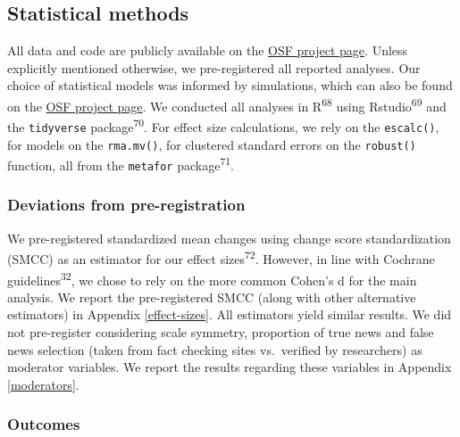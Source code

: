 \documentclass[
  doc,floatsintext]{apa6}
\begin{document}
\subsection{Statistical methods}\label{statistical-methods}

All data and code are publicly available on the \href{https://osf.io/96zbp/?view_only=d2f3147f652e44e2a0414d7d6d9a6c29}{OSF project page}. Unless explicitly mentioned otherwise, we pre-registered all reported analyses. Our choice of statistical models was informed by simulations, which can also be found on the \href{https://osf.io/96zbp/?view_only=d2f3147f652e44e2a0414d7d6d9a6c29}{OSF project page}. We conducted all analyses in R\textsuperscript{68} using Rstudio\textsuperscript{69} and the \texttt{tidyverse} package\textsuperscript{70}. For effect size calculations, we rely on the \texttt{escalc()}, for models on the \texttt{rma.mv()}, for clustered standard errors on the \texttt{robust()} function, all from the \texttt{metafor} package\textsuperscript{71}.

\subsubsection{Deviations from pre-registration}\label{deviations-from-pre-registration}

We pre-registered standardized mean changes using change score standardization (SMCC) as an estimator for our effect sizes\textsuperscript{72}. However, in line with Cochrane guidelines\textsuperscript{32}, we chose to rely on the more common Cohen's d for the main analysis. We report the pre-registered SMCC (along with other alternative estimators) in Appendix \ref{effect-sizes}. All estimators yield similar results. We did not pre-register considering scale symmetry, proportion of true news and false news selection (taken from fact checking sites vs.~verified by researchers) as moderator variables. We report the results regarding these variables in Appendix \ref{moderators}.

\subsubsection{Outcomes}\label{outcomes}
\end{document}
